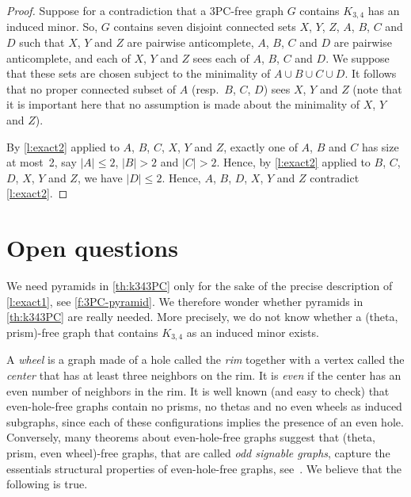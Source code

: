 \documentclass[11pt]{article}
\theoremstyle{definition}
\theoremstyle{definition}
\begin{document}
\longer*

\begin{proof}
  Suppose for a contradiction that a 3PC-free graph $G$ contains
  $K_{3, 4}$ has an induced minor. So, $G$ contains seven disjoint
  connected sets $X$, $Y$, $Z$, $A$, $B$, $C$ and $D$ such that $X$,
  $Y$ and $Z$ are pairwise anticomplete, $A$, $B$, $C$ and $D$ are
  pairwise anticomplete, and each of $X$, $Y$ and $Z$ sees each of
  $A$, $B$, $C$ and $D$.  We suppose that these sets are chosen
  subject to the minimality of $A \cup B \cup C \cup D$.  It follows
  that no proper connected subset of $A$ (resp.~$B$, $C$, $D$) sees
  $X$, $Y$ and $Z$ (note that it is important here that no assumption is made about the minimality of $X$, $Y$ and $Z$).

  By \cref{l:exact2} applied to $A$, $B$, $C$, $X$, $Y$ and $Z$,
  exactly one of $A$, $B$ and $C$ has size at most~2, say
  $|A| \leq 2$, $|B|>2$ and $|C|>2$. Hence, by \cref{l:exact2}
  applied to $B$, $C$, $D$, $X$, $Y$ and $Z$, we have $|D|\leq
  2$. Hence, $A$, $B$, $D$, $X$, $Y$ and $Z$ contradict
  \cref{l:exact2}.
\end{proof}




\section{Open questions}
\label{sec:open}

We need pyramids in \cref{th:k343PC} only for the sake of the precise
description of \cref{l:exact1}, see \cref{f:3PC-pyramid}.  We
therefore wonder whether pyramids in \cref{th:k343PC} are really
needed. More precisely, we do not know whether a (theta, prism)-free
graph that contains $K_{3, 4}$ as an induced minor exists.


A \emph{wheel} is a graph made of a hole called the \emph{rim}
together with a vertex called the \emph{center} that has at least three
neighbors on the rim.  It is \emph{even} if the center has an even
number of neighbors in the rim. It is well known (and easy to check)
that even-hole-free graphs contain no prisms, no thetas and no even
wheels as induced subgraphs, since each of these configurations
implies the presence of an even hole. Conversely, many theorems about
even-hole-free graphs suggest that (theta, prism, even wheel)-free
graphs, that are called \emph{odd signable graphs}, capture the
essentials structural properties of even-hole-free graphs, see~\cite{vuskovic:evensurvey,vuskovic:truemper}. We believe
that the following is true.
\end{document}
